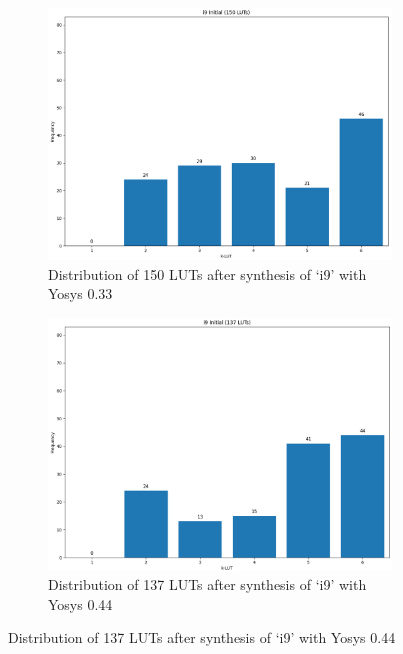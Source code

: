 \begin{figure}
    \begin{subfigure}{0.47\textwidth}
        \centering
        \includegraphics[width=\textwidth]{img/y33.png}
        \caption{Distribution of 150 LUTs after synthesis of `i9' with Yosys 0.33}\label{fig:histogram:y33}
        \Description[]{}
    \end{subfigure}
    \hfill\vspace{4mm}
    \begin{subfigure}{0.47\textwidth}
        \centering
        \includegraphics[width=\textwidth]{img/y44.png}
        \caption{Distribution of 137 LUTs after synthesis of `i9' with Yosys 0.44}\label{fig:histogram:y44}
        \Description[]{}
    \end{subfigure}

\end{figure}
